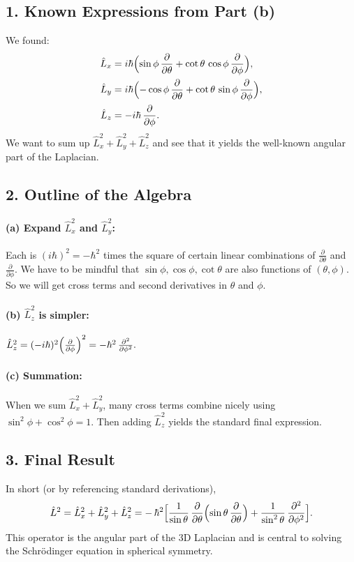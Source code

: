 \documentclass[12pt]{article}
\begin{document}
\subsection*{1. Known Expressions from Part (b)}

We found:
\begin{align*}
\hat{L}_x &= i\hbar\Bigl(\sin\phi\,\frac{\partial}{\partial \theta} + \cot\theta\,\cos\phi\,\frac{\partial}{\partial \phi}\Bigr),\\
\hat{L}_y &= i\hbar\Bigl(-\cos\phi\,\frac{\partial}{\partial \theta} + \cot\theta\,\sin\phi\,\frac{\partial}{\partial \phi}\Bigr),\\
\hat{L}_z &= -i\hbar\,\frac{\partial}{\partial \phi}.
\end{align*}
We want to sum up \(\hat{L}_x^2 + \hat{L}_y^2 + \hat{L}_z^2\) and see that it yields the well-known angular part of the Laplacian.

\subsection*{2. Outline of the Algebra}
\paragraph{(a) Expand $\hat{L}_x^2$ and $\hat{L}_y^2$:}
Each is $(i\hbar)^2 = -\hbar^2$ times the square of certain linear combinations of $\frac{\partial}{\partial\theta}$ and $\frac{\partial}{\partial\phi}$. We have to be mindful that $\sin\phi,\cos\phi,\cot\theta$ are also functions of $(\theta,\phi)$. So we will get cross terms and second derivatives in $\theta$ and $\phi$.

\paragraph{(b) $\hat{L}_z^2$ is simpler:}
\(
\hat{L}_z^2 = (-i\hbar)^2\Bigl(\frac{\partial}{\partial\phi}\Bigr)^2 = -\hbar^2\,\frac{\partial^2}{\partial\phi^2}.
\)

\paragraph{(c) Summation:}
When we sum $\hat{L}_x^2 + \hat{L}_y^2$, many cross terms combine nicely using $\sin^2\phi+\cos^2\phi=1$. Then adding $\hat{L}_z^2$ yields the standard final expression.

\subsection*{3. Final Result}
In short (or by referencing standard derivations),
\begin{equation}
\hat{L}^2 = \hat{L}_x^2 + \hat{L}_y^2 + \hat{L}_z^2
= -\,\hbar^2\Bigl[\frac{1}{\sin\theta}\,\frac{\partial}{\partial \theta}\Bigl(\sin\theta\,\frac{\partial}{\partial \theta}\Bigr) + \frac{1}{\sin^2\theta}\,\frac{\partial^2}{\partial \phi^2}\Bigr].
\end{equation}
This operator is the angular part of the 3D Laplacian and is central to solving the Schr\"odinger equation in spherical symmetry.
\end{document}
